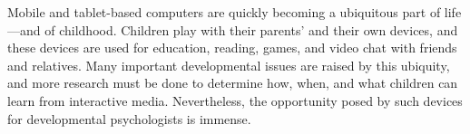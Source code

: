 \documentclass[man,noapacite]{apa2}
\begin{document}
Mobile and tablet-based computers are quickly becoming a ubiquitous part of life---and of childhood. Children play with their parents' and their own devices, and these devices are used for education, reading, games, and video chat with friends and relatives. Many important developmental issues are raised by this ubiquity, and more research must be done to determine how, when, and what children can learn from interactive media. Nevertheless, the opportunity posed by such devices for developmental psychologists is immense.

\newpage



\end{document}
